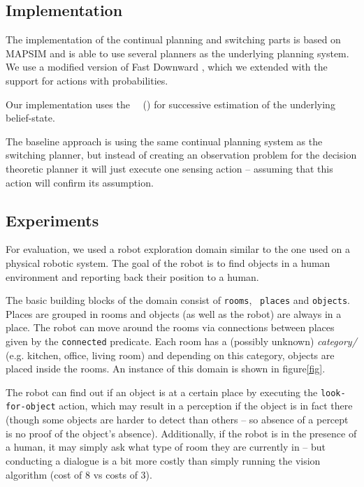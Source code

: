 
\subsection{Implementation}

The implementation of the continual planning and switching parts is
based on MAPSIM \cite{brenner:nebel:jaamas09} and is able to use several planners as
the underlying planning system. We use a modified version of Fast
Downward \cite{fast-downward}, which we extended with the support for
actions with probabilities.

Our implementation uses the
~\citeauthor{king:2009}~(\citeyear{king:2009})  for
successive estimation of the underlying belief-state.

The baseline approach is using the same continual planning system as
the switching planner, but instead of creating an observation problem
for the decision theoretic planner it will just execute one sensing
action -- assuming that this action will confirm its assumption.

\subsection{Experiments}
For evaluation, we used a robot exploration domain similar to the one
used on a physical robotic system. The goal of the robot is to find
objects in a human environment and reporting back their position to a
human.

The basic building blocks of the domain consist of {\tt rooms}, {\tt
places} and {\tt objects}. Places are grouped in rooms and objects (as
well as the robot) are always in a place. The robot can move around
the rooms via connections between places given by the {\tt connected}
predicate. Each room has a (possibly unknown) {\em category/}
(e.g. kitchen, office, living room) and depending on this category,
objects are placed inside the rooms. An instance of this domain is
shown in figure\ref{fig}.

The robot can find out if an object is at a certain place by executing
the {\tt look-for-object} action, which may result in a perception if
the object is in fact there (though some objects are harder to detect
than others -- so absence of a percept is no proof of the object's
absence). Additionally, if the robot is in the presence of a human, it
may simply ask what type of room they are currently in -- but
conducting a dialogue is a bit more costly than simply running the
vision algorithm (cost of 8 vs costs of 3).

